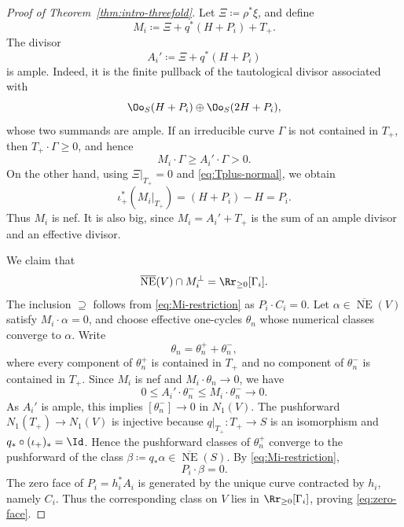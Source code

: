 \documentclass[12pt]{amsart}
\newcommand{\NE}{\overline{\operatorname{NE}}}
\begin{document}
\begin{proof}[Proof of Theorem~\ref{thm:intro-threefold}]
Let $\Xi\coloneqq\rho^*\xi$, and define
\begin{equation}\label{eq:Mi}
 M_i\coloneqq\Xi+q^*(H+P_i)+T_+.
\end{equation}
The divisor
\[
 A_i'\coloneqq\Xi+q^*(H+P_i)
\]
is ample. Indeed, it is the finite pullback of the tautological divisor associated with
\[
 \Oo_S(H+P_i)\oplus\Oo_S(2H+P_i),
\]
whose two summands are ample. If an irreducible curve $\Gamma$ is not contained in $T_+$, then $T_+\cdot\Gamma\geq0$, and hence
\[
 M_i\cdot\Gamma\geq A_i'\cdot\Gamma>0.
\]
On the other hand, using $\Xi|_{T_+}=0$ and \eqref{eq:Tplus-normal}, we obtain
\begin{equation}\label{eq:Mi-restriction}
 \iota_+^*(M_i|_{T_+})
 =(H+P_i)-H
 =P_i.
\end{equation}
Thus $M_i$ is nef. It is also big, since $M_i=A_i'+T_+$ is the sum of an ample divisor and an effective divisor.

We claim that
\begin{equation}\label{eq:zero-face}
 \NE(V)\cap M_i^\perp=\Rr_{\geq0}[\Gamma_i].
\end{equation}
The inclusion $\supseteq$ follows from \eqref{eq:Mi-restriction} as $P_i\cdot C_i=0$. Let $\alpha\in\NE(V)$ satisfy $M_i\cdot\alpha=0$, and choose effective one-cycles $\theta_n$ whose numerical classes converge to $\alpha$. Write
\[
 \theta_n=\theta_n^++\theta_n^-,
\]
where every component of $\theta_n^+$ is contained in $T_+$ and no component of $\theta_n^-$ is contained in $T_+$. Since $M_i$ is nef and $M_i\cdot\theta_n\to0$, we have
\[
 0\leq A_i'\cdot\theta_n^-
 \leq M_i\cdot\theta_n^-
 \longrightarrow0.
\]
As $A_i'$ is ample, this implies $[\theta_n^-]\to0$ in $N_1(V)$. The pushforward $N_1(T_+)\to N_1(V)$ is injective because $q|_{T_+}\colon T_+\to S$ is an isomorphism and $q_*\circ(\iota_+)_*=\Id$. Hence the pushforward classes of $\theta_n^+$ converge to the pushforward of the class $\beta\coloneqq q_*\alpha\in\NE(S)$. By \eqref{eq:Mi-restriction},
\[
 P_i\cdot\beta=0.
\]
The zero face of $P_i=h_i^*A_i$ is generated by the unique curve contracted by $h_i$, namely $C_i$. Thus the corresponding class on $V$ lies in $\Rr_{\geq0}[\Gamma_i]$, proving \eqref{eq:zero-face}.


\end{proof}
\end{document}
